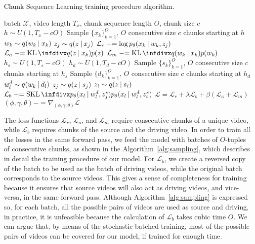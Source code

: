 \begin{algorithm}[tb]
   \caption{Chunk Sequence Learning training procedure algorithm.}
   \label{alg:sampling}
\begin{algorithmic}
\small
{} batch $\mathcal{X}$, video length $T_x$, chunk sequence length $O$, chunk size $c$
  \STATE $h \sim U(1, T_x - cO)$ 
  \STATE Sample $\{x_k\}_{k=1}^O$, $O$ consecutive size $c$ chunks starting at $h$
  \STATE {}
    \STATE $w_k \sim q(w_k \:\lvert\: x_k)$
      \STATE $z_j \sim q(z \:\lvert\: x_j)$
      \STATE $\mathcal{L}_r \mathrel{{+}{=}} \log p_\theta(x_k \:\lvert\: w_k, z_j)$
    \ENDFOR
    \STATE $\mathcal{L}_a \mathrel{{-}{=}} \kl{q(z \given x_k)}{p(z)}$
    \STATE $\mathcal{L}_m \mathrel{{-}{=}} \kl{q(w_k \given x_k)}{p(w_k)}$
  \ENDFOR
\ENDFOR
{}
  \STATE $h_s \sim U(1, T_s - cO)$
  \STATE $h_d \sim U(1, T_d - cO)$
  \STATE Sample $\{s_k\}_{k=1}^O$, $O$ consecutive size $c$ chunks starting at $h_s$
  \STATE Sample $\{d_k\}_{k=1}^O$, $O$ consecutive size $c$ chunks starting at $h_d$
    \STATE $w_l^d \sim q(w_k \:\lvert\: d_l)$
      \STATE $z_j \sim q(z \:\lvert\: s_j)$
        \STATE $z_i \sim q(z \:\lvert\: s_i)$
        \STATE $\mathcal{L}_b \mathrel{{-}{=}} \skl{p_\theta(x_l \given w_l^d, z_j^s)}{p_\theta(x_l \given w_l^d, z_i^s)}$
        \STATE {}
      \ENDFOR
    \ENDFOR
  \ENDFOR
\ENDFOR
\STATE $\mathcal{L} = \mathcal{L}_r + \lambda\mathcal{L}_b + \beta(\mathcal{L}_a + \mathcal{L}_m)$
\STATE $(\phi, \gamma, \theta) \mathrel{{-}{=}} \nabla_{(\phi, \gamma, \theta)} \mathcal{L}$ 
\end{algorithmic}
\end{algorithm}

The loss functions $\mathcal{L}_r$, $\mathcal{L}_a$, and $\mathcal{L}_m$ require consecutive chunks of a unique video, while $\mathcal{L}_b$ requires chunks of the source and the driving video.
In order to train all the losses in the same forward pass, we feed the model with batches of $O$-tuples of consecutive chunks, as shown in the Algorithm~\ref{alg:sampling}, which describes in detail the training procedure of our model.
For $\mathcal{L}_b$, we create a reversed copy of the batch to be used as the batch of driving videos, while the original batch corresponds to the source videos.
This gives a sense of completeness for training because it ensures that source videos will also act as driving videos, and vice-versa, in the same forward pass.
Although Algorithm~\ref{alg:sampling} is expressed so, for each batch, all the possible pairs of videos are used as source and driving, in practice, it is unfeasible because the calculation of $\mathcal{L}_b$ takes cubic time \wrt $O$.
We can argue that, by means of the stochastic batched training, most of the possible pairs of videos can be covered for our model, if trained for enough time.

